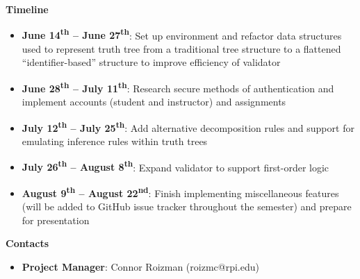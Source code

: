 \documentclass{article}
\begin{document}
\begin{center}
  \textbf{Timeline}
\end{center}
\begin{itemize}
  \item \textbf{June 14\textsuperscript{th} -- June 27\textsuperscript{th}}: Set up environment and refactor data structures used to represent truth tree from a traditional tree structure to a flattened ``identifier-based'' structure to improve efficiency of validator
  \item \textbf{June 28\textsuperscript{th} -- July 11\textsuperscript{th}}: Research secure methods of authentication and implement accounts (student and instructor) and assignments
  \item \textbf{July 12\textsuperscript{th} -- July 25\textsuperscript{th}}: Add alternative decomposition rules and support for emulating inference rules within truth trees
  \item \textbf{July 26\textsuperscript{th} -- August 8\textsuperscript{th}}: Expand validator to support first-order logic
  \item \textbf{August 9\textsuperscript{th} -- August 22\textsuperscript{nd}}: Finish implementing miscellaneous features (will be added to GitHub issue tracker throughout the semester) and prepare for presentation
\end{itemize}

\begin{center}
  \textbf{Contacts}
\end{center}
\begin{itemize}
  \item \textbf{Project Manager}: Connor Roizman (roizmc@rpi.edu)
\end{itemize}
\end{document}
